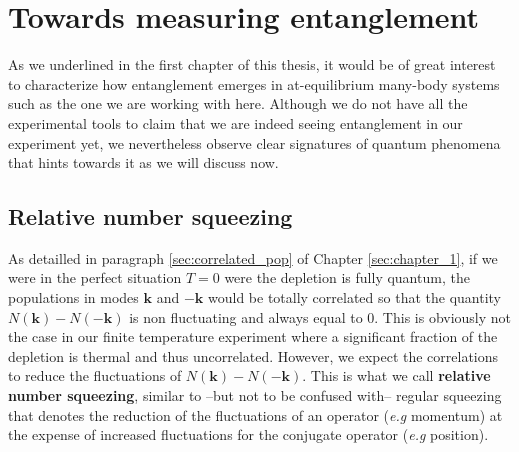 \section{Towards measuring entanglement}

As we underlined in the first chapter of this thesis, it would be of great interest to characterize how entanglement emerges in at-equilibrium many-body systems such as the one we are working with here. Although we do not have all the experimental tools to claim that we are indeed seeing entanglement in our experiment yet, we nevertheless observe clear signatures of quantum phenomena that hints towards it as we will discuss now.



\subsection{Relative number squeezing}

As detailled in paragraph \ref{sec:correlated_pop} of Chapter \ref{sec:chapter_1}, if we were in the perfect situation $T=0$ were the depletion is fully quantum, the populations in modes $\bm{k}$ and $-\bm{k}$ would be totally correlated so that the quantity $N(\bm{k})-N(-\bm{k})$ is non fluctuating and always equal to 0. This is obviously not the case in our finite temperature experiment where a significant fraction of the depletion is thermal and thus uncorrelated. However, we expect the \kmk correlations to reduce the fluctuations of $N(\bm{k})-N(-\bm{k})$. This is what we call \textbf{relative number squeezing}, similar to --but not to be confused with-- regular squeezing \cite{walls1983squeezed} that denotes the reduction of the fluctuations of an operator ({\it e.g} momentum) at the expense of increased fluctuations for the conjugate operator ({\it e.g} position).




